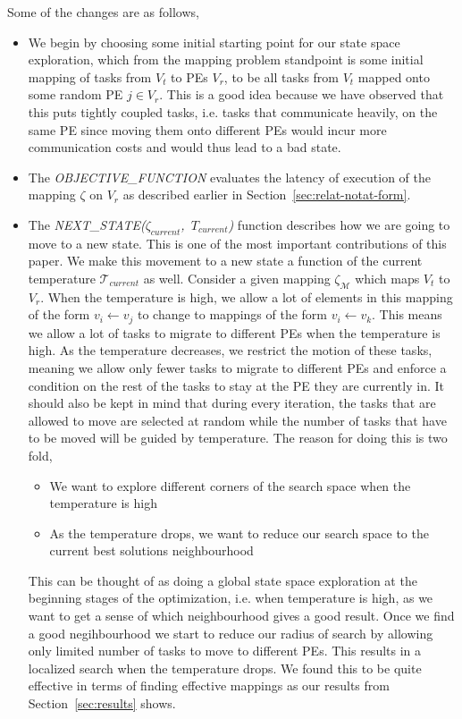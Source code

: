 Some of the changes are as follows,

\begin{itemize}

\item We begin by choosing some initial starting point for our state space exploration, which from
the mapping problem standpoint is some initial mapping of tasks from $V_t$ to
PEs $V_r$, to be all tasks from $V_t$ mapped onto
some random PE $j \in V_r$. This is a good idea because we have observed that
this puts tightly coupled tasks, i.e. tasks that communicate heavily, on the
same PE since moving them onto different PEs would incur more communication
costs and would thus lead to a bad state.

\item The \textit{OBJECTIVE\_FUNCTION} evaluates the latency of execution of
the mapping $\zeta$ on $V_r$ as described earlier in
Section~\ref{sec:relat-notat-form}. 

\item The \mbox{\textit{NEXT\_STATE($\zeta_{current}$, $T_{current}$)}} function
describes how we are going to move to a new state. This is one of the most
important contributions of this paper. We make this movement to a new state a
function of the current temperature $\mathcal{T}_{current}$ as well. Consider a
given mapping $\zeta_\mathcal{M}$ which maps $V_t$ to $V_r$. When the
temperature is high, we allow a lot of elements in this mapping of the form $v_i
\leftarrow v_j$ to change to mappings of the form $v_i \leftarrow v_k$. This
means we allow a lot of tasks to migrate to different PEs when the temperature
is high. As the temperature decreases, we restrict the motion of these tasks,
meaning we allow only fewer tasks to migrate to different PEs and enforce a
condition on the rest of the tasks to stay at the PE they are currently in. It
should also be kept in mind that during every iteration, the tasks that are
allowed to move are selected at random while the number of tasks that have to be
moved will be guided by temperature. The reason for doing this is two fold,
\begin{itemize}
\item We want to explore different corners of the search space when the
temperature is high
\item As the temperature drops, we want to reduce our search space to the
current best solutions neighbourhood
\end{itemize}
This can be thought of as doing a global state space exploration at the
beginning stages of the optimization, i.e. when temperature is high, as
we want to get a sense of which neighbourhood gives a good result. Once
we find a good negihbourhood we start to reduce our radius of search by
allowing only limited number of tasks to move to different PEs. This
results in a localized search when the temperature drops. We found this
to be quite effective in terms of finding effective mappings as our
results from Section~\ref{sec:results} shows.


\end{itemize}
